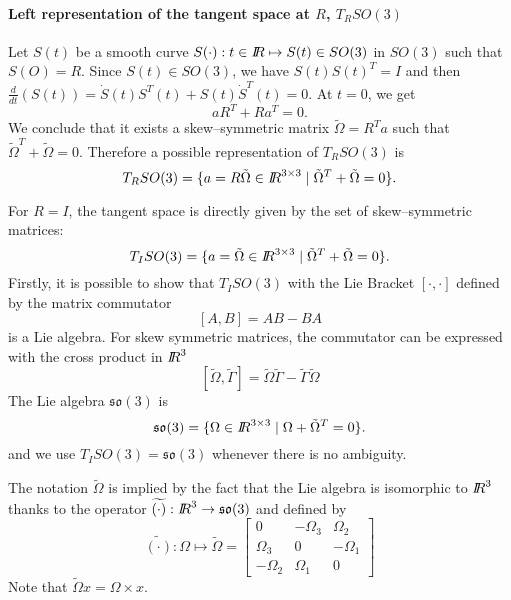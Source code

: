 \paragraph{Left representation of  the tangent space at $R$, $T_RSO(3)$ } Let $S(t)$ be  a smooth curve $S(\cdot) : t\in \mbox{\rm $I\!\!R$} \mapsto S(t)\in SO(3)$ in $SO(3)$ such that $S(O)= R$.
Since $S(t)\in SO(3)$, we have $S(t)S(t)^T=I$ and then $\frac{d}{dt} (S(t)) = \dot S(t)S^T(t) +  S(t) \dot S^T(t) =0$. At $t=0$, we get
\begin{equation}
  \label{eq:48}
 a R^T +  R a^T =0.
\end{equation}
We conclude that it exists a skew--symmetric matrix $\tilde \Omega = R^T a$ such that $\tilde \Omega^T + \tilde \Omega =0$. Therefore a possible representation of  $T_RSO(3)$ is
\begin{equation}
  \label{eq:49}
  T_RSO(3) = \{ a = R \tilde \Omega \in \mbox{\rm $I\!\!R$}^{3\times 3} \mid \tilde \Omega^T + \tilde \Omega =0 \}.
\end{equation}

For $R=I$, the tangent space is directly given by the set of  skew--symmetric matrices:
\begin{equation}
  \label{eq:50}
  T_ISO(3) = \{ a = \tilde \Omega\in \mbox{\rm $I\!\!R$}^{3\times 3} \mid \tilde \Omega^T + \tilde \Omega =0 \}.
\end{equation}
Firstly, it is possible to show that $T_ISO(3)$ with the Lie Bracket $[\cdot,\cdot]$ defined by the matrix commutator
\begin{equation}
  \label{eq:51}
  [A,B] = AB-BA
\end{equation}
is a Lie algebra. For skew symmetric matrices, the commutator can be expressed with the cross product in $\mbox{\rm $I\!\!R$}^3$
\begin{equation}
  \label{eq:52}
  [\tilde \Omega, \tilde \Gamma] = \tilde \Omega \tilde \Gamma - \tilde \Gamma \tilde \Omega
\end{equation}
The  Lie algebra  $\mathfrak{so}(3)$  is 
\begin{equation}
  \label{eq:53}
  \mathfrak{so}(3) =\{\Omega\in \mbox{\rm $I\!\!R$}^{3\times 3} \mid \Omega + \tilde \Omega^T =0\}.
\end{equation}
and we use   $T_ISO(3) =  \mathfrak{so}(3)$ whenever there is no ambiguity.


The notation $\tilde \Omega$ is implied by the fact that the Lie algebra is isomorphic to $\mbox{\rm $I\!\!R$}^3$ thanks to the operator $\widetilde{(\cdot)} :\mbox{\rm $I\!\!R$}^3 \rightarrow \mathfrak{so}(3)$ and defined by
\begin{equation}
  \label{eq:54}
 \widetilde{(\cdot)}: \Omega \mapsto \tilde \Omega =
  \begin{bmatrix}
    0 & -\Omega_3 & \Omega_2 \\
    \Omega_3 & 0 & -\Omega_1 \\
    -\Omega_2  & \Omega_1 & 0
  \end{bmatrix}
\end{equation}
Note that $\tilde \Omega x = \Omega \times x$.

